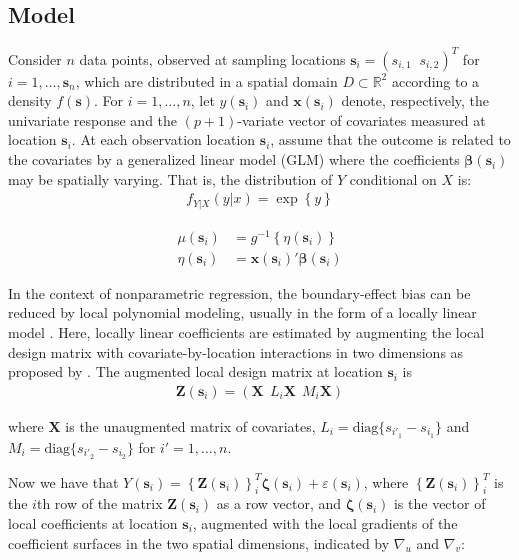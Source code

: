 \documentclass[authoryear, review, 11pt]{elsarticle}
\begin{document}
	\subsection{Model}	
	Consider $n$ data points, observed at sampling locations $\bm{s}_i = (s_{i,1} \;\; s_{i,2})^T$ for $i = 1, \dots, \bm{s}_n$, which are distributed in a spatial domain $D \subset \mathbb{R}^2$ according to a density $f(\bm{s})$. For $i = 1, \dots, n$, let $y(\bm{s}_i)$ and $\bm{x}(\bm{s}_i)$ denote, respectively, the univariate response and the $(p+1)$-variate vector of covariates measured at location $\bm{s}_i$. At each observation location $\bm{s}_i$, assume that the outcome is related to the covariates by a generalized linear model (GLM) where the coefficients $\bm{\beta}(\bm{s}_i)$ may be spatially varying. That is, the distribution of $Y$ conditional on $X$ is:
    \begin{align*}
        f_{Y|X} (y|x) = \exp \left\{ y \right\}
    \end{align*}

	\begin{align}\label{eq:glm(s)}
        \mu(\bm{s}_i) &= g^{-1} \left\{ \eta(\bm{s}_i) \right\} \\
		\eta(\bm{s}_i) &= \bm{x}(\bm{s}_i)' \bm{\beta}(\bm{s}_i) 
	\end{align}

    In the context of nonparametric regression, the boundary-effect bias can be reduced by local polynomial modeling, usually in the form of a locally linear model \citep{Fan-1996}. Here, locally linear coefficients are estimated by augmenting the local design matrix with covariate-by-location interactions in two dimensions as proposed by \cite{Wang:2008b}. The augmented local design matrix at location $\bm{s}_i$ is
    \begin{align}
		\bm{Z}(\bm{s}_i) = \left( \bm{X}  \:\: L_i \bm{X} \:\: M_i \bm{X} \right)
	\end{align} 
  
	where $\bm{X}$ is the unaugmented matrix of covariates, $L_i = \text{diag}\{s_{i'_1} - s_{i_1}\}$ and $M_i = \text{diag}\{s_{i'_2} - s_{i_2}\}$ for $i' = 1, \dots, n$.

    Now we have that $Y(\bm{s}_i) = \left\{ \bm{Z}(\bm{s}_i) \right\}^T_i \bm{\zeta}(\bm{s}_i) + \varepsilon(\bm{s}_i)$, where $\left\{ \bm{Z}(\bm{s}_i) \right\}^T_i$ is the $i$th row of the matrix $\bm{Z}(\bm{s}_i)$ as a row vector, and $\bm{\zeta}(\bm{s}_i)$ is the vector of local coefficients at location $\bm{s}_i$, augmented with the local gradients of the coefficient surfaces in the two spatial dimensions, indicated by $\nabla_u$ and $\nabla_v$:
\end{document}
